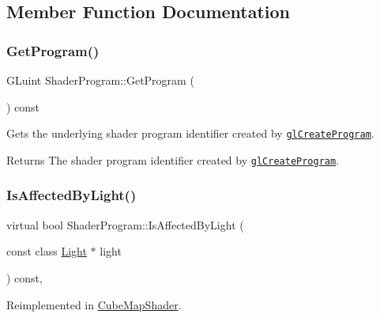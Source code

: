 \subsection{Member Function Documentation}
\hypertarget{class_shader_program_a7313b3596bcd6d982d9624a46cc2acc6}{}\label{class_shader_program_a7313b3596bcd6d982d9624a46cc2acc6}
\subsubsection{\texorpdfstring{Get\+Program()}{GetProgram()}}
{\footnotesize\ttfamily G\+Luint Shader\+Program\+::\+Get\+Program (\begin{DoxyParamCaption}{ }\end{DoxyParamCaption}) const\hspace{0.3cm}{\ttfamily [inline]}}



Gets the underlying shader program identifier created by \href{https://www.opengl.org/sdk/docs/man/html/glCreateProgram.xhtml}{\tt gl\+Create\+Program}.

\begin{DoxyReturn}{Returns}
The shader program identifier created by \href{https://www.opengl.org/sdk/docs/man/html/glCreateProgram.xhtml}{\tt gl\+Create\+Program}.
\end{DoxyReturn}
\hypertarget{class_shader_program_a20b5ed7b5f81154025eb7b6f1be70f84}{}\label{class_shader_program_a20b5ed7b5f81154025eb7b6f1be70f84}
\subsubsection{\texorpdfstring{Is\+Affected\+By\+Light()}{IsAffectedByLight()}}
{\footnotesize\ttfamily virtual bool Shader\+Program\+::\+Is\+Affected\+By\+Light (\begin{DoxyParamCaption}\item[{const class \hyperlink{class_light}{Light} $\ast$}]{light }\end{DoxyParamCaption}) const\hspace{0.3cm}{\ttfamily [inline]}, {\ttfamily [virtual]}}



Reimplemented in \hyperlink{class_cube_map_shader_aa0c9e535cb18663acd9857165abc788f}{Cube\+Map\+Shader}.

